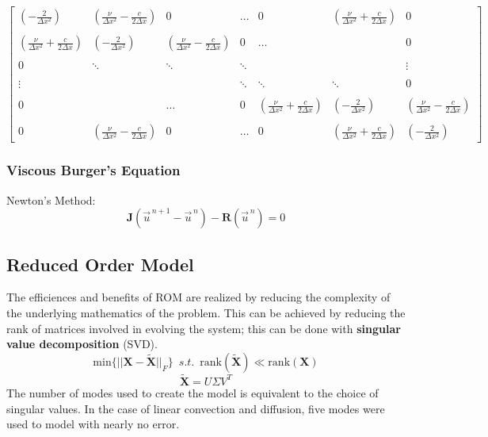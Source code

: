\documentclass{a0poster}
\begin{document}
\begin{multicols}{3}
\large
$$\begin{bmatrix}
(-\frac{2}{\Delta x^2}) & (\frac{\nu}{\Delta x^2} - \frac{c}{2\Delta x}) & 0 &\dots & 0 & (\frac{\nu}{\Delta x^2} +\frac{c}{2\Delta x}) & 0 \\ \\
(\frac{\nu}{\Delta x^2} +\frac{c}{2\Delta x}) & (-\frac{2}{\Delta x^2}) & (\frac{\nu}{\Delta x^2} - \frac{c}{2\Delta x}) & 0 &\dots & & 0 \\ \\
0&\ddots & \ddots & \ddots &  &  & \vdots \\ \\
\vdots& & & \ddots & \ddots & \ddots & 0 \\ \\
0 & & \dots & 0 &(\frac{\nu}{\Delta x^2} +\frac{c}{2\Delta x}) & (-\frac{2}{\Delta x^2}) & (\frac{\nu}{\Delta x^2} - \frac{c}{2\Delta x})  \\ \\
0 & (\frac{\nu}{\Delta x^2} - \frac{c}{2\Delta x}) & 0 & \dots & 0 & (\frac{\nu}{\Delta x^2} +\frac{c}{2\Delta x}) &  (-\frac{2}{\Delta x^2}) 
   
\end{bmatrix}$$

\LARGE
\subsubsection{Viscous Burger's Equation}
Newton's Method:
$$\mathrm{\textbf{J}} \left( \vec{u}^{\,n+1} - \vec{u}^{\,n} \right) - \mathrm{\textbf{R}} \left( \vec{u}^{\,n} \right)=0$$

\subsection{Reduced Order Model}
\Large
The efficiences and benefits of ROM are realized by reducing the complexity of the underlying mathematics of the problem. This can be achieved by reducing the rank of matrices involved in evolving the system; this can be done with \textbf{singular value decomposition} (SVD).
$$\mathrm{min} \{ ||\textbf{X} - \tilde{\textbf{X}}||_F \} \,\,\,s.t.\,\,\, \mathrm{rank}(\tilde{\textbf{X}}) \ll \mathrm{rank}(\textbf{X})$$
$$\tilde{\textbf{X}} = U \Sigma V^T$$
The number of modes used to create the model is equivalent to the choice of singular values. In the case of linear convection and diffusion, five modes were used to model with nearly no error.

\vspace{-2cm}

\end{multicols}
\end{document}
